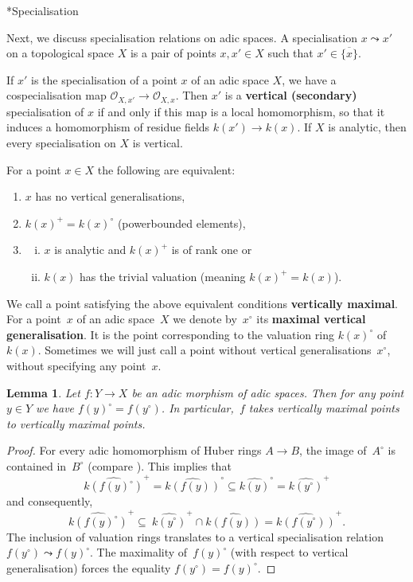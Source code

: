 \documentclass[a4paper,twoside,11pt,reqno]{amsart}
\makeatletter
\newcommand{\cO}{{\mathcal O}}
\def\subsubsection{\@startsection{subsubsection}{3}%
      \z@{.5\linespacing\@plus.7\linespacing}{-.5em}%
      {\normalfont\bfseries}}
\newtheorem{lem}[thm]{Lemma}
\theoremstyle{definition}
\numberwithin{equation}{subsection}
\makeatother
\begin{document}
\subsubsection*{Specialisation}

Next, we discuss specialisation relations on adic spaces. A specialisation $x\leadsto x'$ on a topological space $X$ is a pair of points $x,x'\in X$ such that $x'\in\overline{\{x\}}$. 

If $x'$ is the specialisation of a point $x$ of an adic space $X$, we have a cospecialisation map $\cO_{X,x'}\to \cO_{X,x}$.
Then $x'$ is a \textbf{vertical (secondary)} specialisation of $x$ if and only if this map is a local homomorphism, so that it induces a homomorphism of residue fields $k(x')\to k(x)$. 
If $X$ is analytic, then every specialisation on $X$ is vertical. 

For a point $x\in X$ the following are equivalent:
\begin{enumerate}
    \item $x$ has no vertical generalisations,
    \item $k(x)^+ = k(x)^\circ$ (powerbounded elements),
    \item \begin{enumerate}[(i)]
            \item $x$ is analytic and $k(x)^+$ is of rank one or
            \item $k(x)$ has the trivial valuation (meaning $k(x)^+=k(x)$).
          \end{enumerate}
\end{enumerate}
We call a point satisfying the above equivalent conditions {\bf vertically maximal}.
For a point~$x$ of an adic space~$X$ we denote by~$x^\circ$ its {\bf maximal vertical generalisation}. 
It is the point corresponding to the valuation ring $k(x)^\circ$ of~$k(x)$.
Sometimes we will just call a point without vertical generalisations~$x^\circ$, without specifying any point~$x$.

\begin{lem} \label{lem:adic-preserves-vertical-maximal}
    Let $f \colon Y \to X$ be an adic morphism of adic spaces.
    Then for any point $y \in Y$ we have $f(y)^\circ = f(y^\circ)$.
    In particular,~$f$ takes vertically maximal points to vertically maximal points.
\end{lem}

\begin{proof}
    For every adic homomorphism of Huber rings $A \to B$, the image of~$A^\circ$ is contained in~$B^\circ$ (compare \cite[Lemma~1.8~(i)]{HuberContinuousValuations}).
    This implies that
    \[
        \widehat{k(f(y)^\circ)}^+ = \widehat{k(f(y))}^\circ \subseteq \widehat{k(y)}^\circ = \widehat{k(y^\circ)}^+
    \]
    and consequently, 
    \[
        \widehat{k(f(y)^\circ)}^+ \subseteq \ \widehat{k(y^\circ)}^+ \cap \widehat{k(f(y))} = \widehat{k(f(y^\circ))}^+.
    \]
    The inclusion of valuation rings translates to a vertical specialisation relation $f(y^\circ) \leadsto f(y)^\circ$.
    The maximality of~$f(y)^\circ$ (with respect to vertical generalisation) forces the equality $f(y^\circ) = f(y)^\circ$.
\end{proof}
\end{document}
